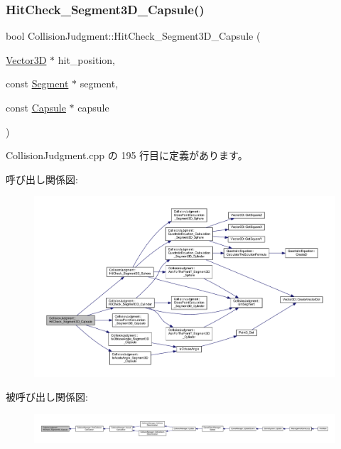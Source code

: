 \subsubsection{\texorpdfstring{Hit\+Check\+\_\+\+Segment3\+D\+\_\+\+Capsule()}{HitCheck\_Segment3D\_Capsule()}}
{\footnotesize\ttfamily bool Collision\+Judgment\+::\+Hit\+Check\+\_\+\+Segment3\+D\+\_\+\+Capsule (\begin{DoxyParamCaption}\item[{\mbox{\hyperlink{class_vector3_d}{Vector3D}} $\ast$}]{hit\+\_\+position,  }\item[{const \mbox{\hyperlink{class_segment}{Segment}} $\ast$}]{segment,  }\item[{const \mbox{\hyperlink{class_capsule}{Capsule}} $\ast$}]{capsule }\end{DoxyParamCaption})\hspace{0.3cm}{\ttfamily [static]}}



 Collision\+Judgment.\+cpp の 195 行目に定義があります。

呼び出し関係図\+:\nopagebreak
\begin{figure}[H]
\begin{center}
\leavevmode
\includegraphics[width=350pt]{class_collision_judgment_a21938f544146999d01d96f855277727b_cgraph}
\end{center}
\end{figure}
被呼び出し関係図\+:
\nopagebreak
\begin{figure}[H]
\begin{center}
\leavevmode
\includegraphics[width=350pt]{class_collision_judgment_a21938f544146999d01d96f855277727b_icgraph}
\end{center}
\end{figure}
\mbox{\label{class_collision_judgment_a61308e967a8569bcee4b25c74e28826d}} 
